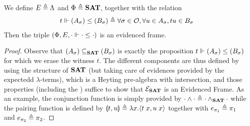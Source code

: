 \documentclass[a4paper,UKenglish,cleveref, autoref, thm-restate]{lipics-v2021}
\begin{document}
\begin{proposition}\label{prop:EF_notre}
  We define $E \triangleq \Lambda$ and $\Phi \triangleq {\mathbf{SAT}}$, together with the relation
  \[t \Vdash (A_\sigma) \leq (B_\sigma)\triangleq \forall \sigma \in \mathcal O, \forall u \in A_{\sigma}, tu \in B_{\sigma}\]
  Then the triple $(\Phi,E,\cdot \Vdash \cdot \leq \cdot)$ is an evidenced frame.
\end{proposition}

\begin{proof}
Observe that $(A_\sigma) \subseteq_{{\mathbf{SAT}}} (B_\sigma)$ is exactly the proposition $t \Vdash (A_\sigma) \leq (B_\sigma)$
for which we erase the witness $t$.
 The different components are thus defined by using the structure of ${\mathbf{SAT}}$ (but taking care of evidences provided
 by the expectedd $\lambda$-terms),
 which is a Heyting pre-algebra with intersection,
 and those properties (including the )
 suffice to show that $\mathcal{E}_{{\mathbf{SAT}}}$ is an Evidenced Frame.
 As an example, the conjunction function is simply provided by
$\cdot \land \cdot \triangleq \cdot \land_{{\mathbf{SAT}}} \cdot$ while
the pairing function is defined by $\llparenthesis t,u\rrparenthesis \triangleq \lambda x. \langle t\;x,u\;x \rangle$
    together with $e_{\pi_1} \triangleq \pi_1$ and $e_{\pi_2} \triangleq \pi_2$.

\end{proof}
\end{document}
